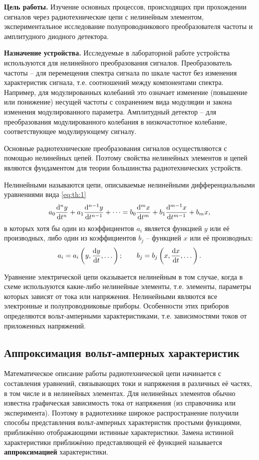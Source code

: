 \documentclass[14pt]{extarticle}
\begin{document}
	\textbf{Цель работы.} Изучение основных процессов, происходящих при прохождении сигналов через радиотехнические цепи с нелинейным элементом, экспериментальное исследование полупроводникового преобразователя частоты и амплитудного диодного детектора.
	
	\textbf{Назначение устройства.} Исследуемые в лабораторной работе устройства используются для нелинейного преобразования сигналов. Преобразователь частоты -- для перемещения спектра сигнала по шкале частот без изменения характеристик сигнала, т.е. соотношений между компонентами спектра. Например, для модулированных колебаний это означает изменение (повышение или понижение) несущей частоты с сохранением вида модуляции и закона изменения модулированного параметра. Амплитудный детектор -- для преобразования модулированного колебания в низкочастотное колебание, соответствующее модулирующему сигналу.
	
	Основные радиотехнические преобразования сигналов осуществляются с помощью нелинейных цепей. Поэтому свойства нелинейных элементов и цепей являются фундаментом для теории большинства радиотехнических устройств. 
	
	Нелинейными называются цепи, описываемые нелинейными дифференциальными уравнениями вида \cref{eq:th:1}
	\begin{align} \label{eq:th:1}
		a_0 \dv[n]{y}{t} + a_1 \dv[n-1]{y}{t} + \dots = b_0 \dv[m]{x}{t} + b_1 \dv[m-1]{x}{t} + b_m x,
	\end{align}  
	в которых хотя бы один из коэффициентов $a_i$ является функцией $y$ или её производных, либо один из коэффициентов $b_j$ -- функцией $x$ или её производных:
	\[
	a_i = a_i \left(y, \dv{y}{t}, \dots\right); \qquad b_j = b_j\left(x, \dv{x}{t}, \dots\right).
	\] 
	
	Уравнение электрической цепи оказывается нелинейным в том случае, когда в схеме используются какие-либо нелинейные элементы, т.е. элементы, параметры которых зависят от тока или напряжения. Нелинейными являются все электронные и полупроводниковые приборы. Особенности этих приборов определяются вольт-амперными характеристиками, т.е. зависимостями токов от приложенных напряжений.
	
	\subsection{Аппроксимация вольт-амперных характеристик}
	
	Математическое описание работы радиотехнической цепи начинается с составления уравнений, связывающих токи и напряжения в различных её частях, в том числе и в нелинейных элементах. Для нелинейных элементов обычно известна графическая зависимость тока от напряжения (из справочника или эксперимента). Поэтому в радиотехнике широкое распространение получили способы представления вольт-амперных характеристик простыми функциями, приближённо отображающими истинные характеристики. Замена истинной характеристики приближённо представляющей её функцией называется \textbf{аппроксимацией} характеристики.
	
\end{document}
